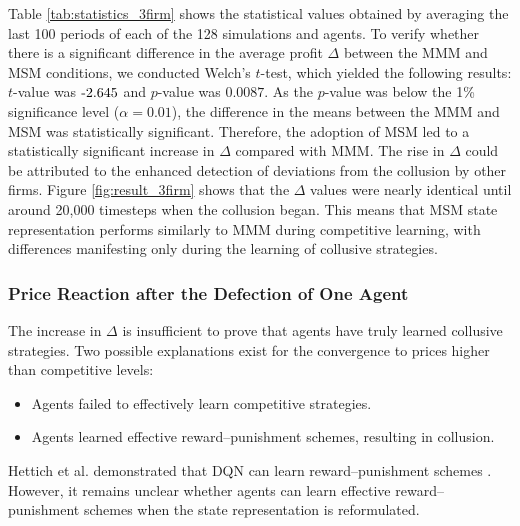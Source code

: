 \documentclass[runningheads]{llncs}
\begin{document}
    Table \ref{tab:statistics_3firm} shows the statistical values obtained by averaging the last 100 periods of each of the 128 simulations and agents.
    To verify whether there is a significant difference in the average profit $\Delta$ between the MMM and MSM conditions, we conducted Welch’s $t$-test, which yielded the following results: $t$-value was \($-$2.645\) and $p$-value was \(0.0087\). 
    As the $p$-value was below the 1\% significance level (\(\alpha = 0.01\)), the difference in the means between the MMM and MSM was statistically significant.
    Therefore, the adoption of MSM led to a statistically significant increase in $\Delta$ compared with MMM.    
    The rise in $\Delta$ could be attributed to the enhanced detection of deviations from the collusion by other firms.
    Figure \ref{fig:result_3firm} shows that the $\Delta$ values were nearly identical until around 20,000 timesteps when the collusion began.
    This means that MSM state representation performs similarly to MMM during competitive learning, with differences manifesting only during the learning of collusive strategies.

\subsubsection{Price Reaction after the Defection of One Agent}
    The increase in $\Delta$ is insufficient to prove that agents have truly learned collusive strategies.
    Two possible explanations exist for the convergence to prices higher than competitive levels:
    \begin{itemize}
        \item Agents failed to effectively learn competitive strategies.
        \item Agents learned effective reward--punishment schemes, resulting in collusion.
    \end{itemize}
    Hettich et al. demonstrated that DQN can learn reward--punishment schemes \cite{hettich2021}.
    However, it remains unclear whether agents can learn effective reward--punishment schemes when the state representation is reformulated.
\end{document}
